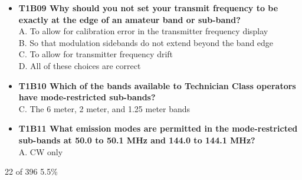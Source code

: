 \documentclass[10pt]{beamer}
\begin{document}
\begin{frame}
\begin{itemize}[<+->]
\item\textbf{T1B09 Why should you not set your transmit frequency to be exactly at the edge of an amateur band or sub-band?} \hfil \\ A. To allow for calibration error in the transmitter frequency display \hfil \\ B. So that modulation sidebands do not extend beyond the band edge \hfil \\ C. To allow for transmitter frequency drift \hfil \\ D. All of these choices are correct
\item\textbf{T1B10 Which of the bands available to Technician Class operators have mode-restricted sub-bands?} \hfil\\ C. The 6 meter, 2 meter, and 1.25 meter bands
\item\textbf{T1B11 What emission modes are permitted in the mode-restricted sub-bands at 50.0 to 50.1 MHz and 144.0 to 144.1 MHz? }\hfil \\ A. CW only
\end{itemize}
\tiny 22 of 396 5.5\%
\end{frame}
\end{document}

